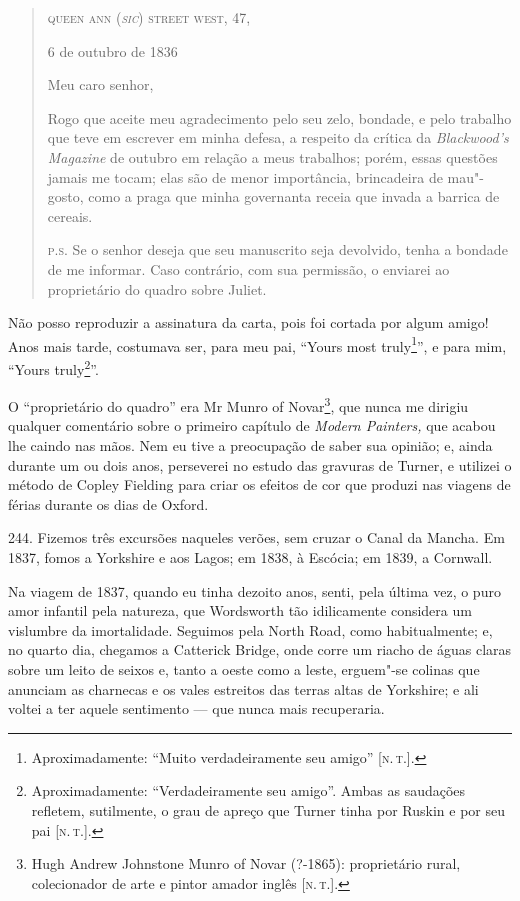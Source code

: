 \begin{quote}
\hfill\textsc{queen ann (\emph{sic}) street west, 47,}

\hfill{}6 de outubro de 1836

Meu caro senhor,

Rogo que aceite meu agradecimento pelo seu zelo,
bondade, e pelo trabalho que teve em escrever em minha defesa, a
respeito da crítica da \emph{Blackwood's Magazine} de outubro em relação
a meus trabalhos; porém, essas questões jamais me tocam; elas são de
menor importância, brincadeira de mau"-gosto, como a praga que minha
governanta receia que invada a barrica de cereais.

\textsc{p.s.} Se o senhor deseja que seu manuscrito seja devolvido, tenha a
bondade de me informar. Caso contrário, com sua permissão, o enviarei ao
proprietário do quadro sobre Juliet.
\end{quote}

Não posso reproduzir a assinatura da carta, pois foi cortada por algum
amigo! Anos mais tarde, costumava ser, para meu pai, ``Yours most
truly\footnote{Aproximadamente: ``Muito verdadeiramente seu amigo''
  {[}\textsc{n.\,t.}{]}.}'', e para mim, ``Yours truly\footnote{Aproximadamente:
  ``Verdadeiramente seu amigo''. Ambas as saudações refletem,
  sutilmente, o grau de apreço que Turner tinha por Ruskin e por seu pai
  {[}\textsc{n.\,t.}{]}.}''.

O ``proprietário do quadro'' era Mr Munro of Novar\footnote{Hugh Andrew
  Johnstone Munro of Novar (?-1865): proprietário rural, colecionador de
  arte e pintor amador inglês {[}\textsc{n.\,t.}{]}.}, que nunca me dirigiu
qualquer comentário sobre o primeiro capítulo de \emph{Modern Painters,}
que acabou lhe caindo nas mãos. Nem eu tive a preocupação de saber sua
opinião; e, ainda durante um ou dois anos, perseverei no estudo das
gravuras de Turner, e utilizei o método de Copley Fielding para criar os
efeitos de cor que produzi nas viagens de férias durante os dias de
Oxford.

244. Fizemos três excursões naqueles verões, sem cruzar o Canal da
Mancha. Em 1837, fomos a Yorkshire e aos Lagos; em 1838, à Escócia; em
1839, a Cornwall.

Na viagem de 1837, quando eu tinha dezoito anos, senti, pela última vez,
o puro amor infantil pela natureza, que Wordsworth tão idilicamente
considera um vislumbre da imortalidade. Seguimos pela North Road, como
habitualmente; e, no quarto dia, chegamos a Catterick Bridge, onde corre
um riacho de águas claras sobre um leito de seixos e, tanto a oeste como
a leste, erguem"-se colinas que anunciam as charnecas e os vales
estreitos das terras altas de Yorkshire; e ali voltei a ter aquele
sentimento --- que nunca mais recuperaria.

